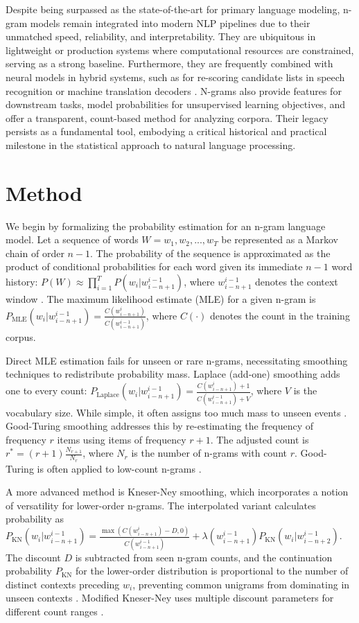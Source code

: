 \documentclass[10pt,a4paper]{article}
\begin{document}
Despite being surpassed as the state-of-the-art for primary language modeling, n-gram models remain integrated into modern NLP pipelines due to their unmatched speed, reliability, and interpretability. They are ubiquitous in lightweight or production systems where computational resources are constrained, serving as a strong baseline. Furthermore, they are frequently combined with neural models in hybrid systems, such as for re-scoring candidate lists in speech recognition or machine translation decoders \cite{anonndhybrid_ref}. N-grams also provide features for downstream tasks, model probabilities for unsupervised learning objectives, and offer a transparent, count-based method for analyzing corpora. Their legacy persists as a fundamental tool, embodying a critical historical and practical milestone in the statistical approach to natural language processing.


\section{ Method }
We begin by formalizing the probability estimation for an n-gram language model. Let a sequence of words \(W = w_1, w_2, ..., w_T\) be represented as a Markov chain of order \(n-1\). The probability of the sequence is approximated as the product of conditional probabilities for each word given its immediate \(n-1\) word history: \(P(W) \approx \prod_{i=1}^{T} P(w_i | w_{i-n+1}^{i-1})\), where \(w_{i-n+1}^{i-1}\) denotes the context window \cite{pradhannonesemantic}. The maximum likelihood estimate (MLE) for a given n-gram is \(P_{\text{MLE}}(w_i | w_{i-n+1}^{i-1}) = \frac{C(w_{i-n+1}^{i})}{C(w_{i-n+1}^{i-1})}\), where \(C(\cdot)\) denotes the count in the training corpus.

Direct MLE estimation fails for unseen or rare n-grams, necessitating smoothing techniques to redistribute probability mass. Laplace (add-one) smoothing adds one to every count: \(P_{\text{Laplace}}(w_i | w_{i-n+1}^{i-1}) = \frac{C(w_{i-n+1}^{i}) + 1}{C(w_{i-n+1}^{i-1}) + V}\), where \(V\) is the vocabulary size. While simple, it often assigns too much mass to unseen events \cite{goodman2009optically}. Good-Turing smoothing addresses this by re-estimating the frequency of frequency \(r\) items using items of frequency \(r+1\). The adjusted count is \(r^* = (r+1) \frac{N_{r+1}}{N_r}\), where \(N_r\) is the number of n-grams with count \(r\). Good-Turing is often applied to low-count n-grams \cite{sampson2015a}.

A more advanced method is Kneser-Ney smoothing, which incorporates a notion of versatility for lower-order n-grams. The interpolated variant calculates probability as \(P_{\text{KN}}(w_i | w_{i-n+1}^{i-1}) = \frac{\max(C(w_{i-n+1}^{i}) - D, 0)}{C(w_{i-n+1}^{i-1})} + \lambda(w_{i-n+1}^{i-1}) P_{\text{KN}}(w_i | w_{i-n+2}^{i-1})\). The discount \(D\) is subtracted from seen n-gram counts, and the continuation probability \(P_{\text{KN}}\) for the lower-order distribution is proportional to the number of distinct contexts preceding \(w_i\), preventing common unigrams from dominating in unseen contexts \cite{andres-ferrer2009extensions}. Modified Kneser-Ney uses multiple discount parameters for different count ranges \cite{goodman2009optically}.
\end{document}
